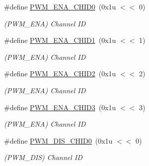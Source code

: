 \begin{DoxyCompactItemize}
\#define \mbox{\hyperlink{group__SAME70__PWM_ga77c0afa3572c801d2b6cd0290b28aa4b}{P\+W\+M\+\_\+\+E\+N\+A\+\_\+\+C\+H\+I\+D0}}~(0x1u $<$$<$ 0)
\begin{DoxyCompactList}\small\item\em (P\+W\+M\+\_\+\+E\+NA) Channel ID \end{DoxyCompactList}\item 
\mbox{\label{group__SAME70__PWM_ga0a4948f507b7d676ab5b011710d94d5a}} 
\#define \mbox{\hyperlink{group__SAME70__PWM_ga0a4948f507b7d676ab5b011710d94d5a}{P\+W\+M\+\_\+\+E\+N\+A\+\_\+\+C\+H\+I\+D1}}~(0x1u $<$$<$ 1)
\begin{DoxyCompactList}\small\item\em (P\+W\+M\+\_\+\+E\+NA) Channel ID \end{DoxyCompactList}\item 
\mbox{\label{group__SAME70__PWM_ga8de33fe21d0568c5af66072ea224b374}} 
\#define \mbox{\hyperlink{group__SAME70__PWM_ga8de33fe21d0568c5af66072ea224b374}{P\+W\+M\+\_\+\+E\+N\+A\+\_\+\+C\+H\+I\+D2}}~(0x1u $<$$<$ 2)
\begin{DoxyCompactList}\small\item\em (P\+W\+M\+\_\+\+E\+NA) Channel ID \end{DoxyCompactList}\item 
\mbox{\label{group__SAME70__PWM_gaa51ecf03f17443c907a60d29f7e63ffb}} 
\#define \mbox{\hyperlink{group__SAME70__PWM_gaa51ecf03f17443c907a60d29f7e63ffb}{P\+W\+M\+\_\+\+E\+N\+A\+\_\+\+C\+H\+I\+D3}}~(0x1u $<$$<$ 3)
\begin{DoxyCompactList}\small\item\em (P\+W\+M\+\_\+\+E\+NA) Channel ID \end{DoxyCompactList}\item 
\mbox{\label{group__SAME70__PWM_ga4091417cf1ab606fbb4763bb93ba4740}} 
\#define \mbox{\hyperlink{group__SAME70__PWM_ga4091417cf1ab606fbb4763bb93ba4740}{P\+W\+M\+\_\+\+D\+I\+S\+\_\+\+C\+H\+I\+D0}}~(0x1u $<$$<$ 0)
\begin{DoxyCompactList}\small\item\em (P\+W\+M\+\_\+\+D\+IS) Channel ID \end{DoxyCompactList}\item 
\mbox{\label{group__SAME70__PWM_ga018c7471f812f9bbbfb758e7d1d95a35}} 
$$
\end{DoxyCompactItemize}
